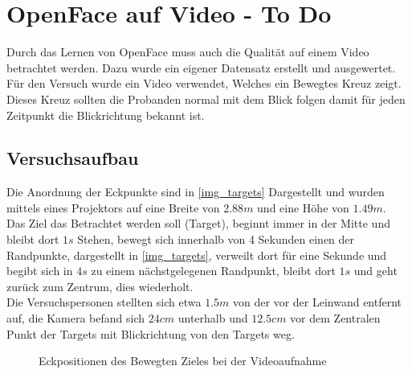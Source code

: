 \section{OpenFace auf Video - To Do}
Durch das Lernen von OpenFace muss auch die Qualität auf einem Video betrachtet werden. Dazu wurde ein eigener Datensatz erstellt und ausgewertet.\\
Für den Versuch wurde ein Video verwendet, Welches ein Bewegtes Kreuz zeigt. Dieses Kreuz sollten die Probanden normal mit dem Blick folgen damit für jeden Zeitpunkt die Blickrichtung bekannt ist.
\subsection{Versuchsaufbau}
Die Anordnung der Eckpunkte sind in \autoref{img_targets} Dargestellt und wurden mittels eines Projektors auf eine Breite von $2.88m$ und eine Höhe von $1.49m$.\\
Das Ziel das Betrachtet werden soll (Target), beginnt immer in der Mitte und bleibt dort $1s$ Stehen, bewegt sich innerhalb von 4 Sekunden einen der Randpunkte, dargestellt in \autoref{img_targets}, verweilt dort für eine Sekunde und begibt sich in $4s$ zu einem nächstgelegenen Randpunkt, bleibt dort $1s$ und geht zurück zum Zentrum, dies wiederholt.\\
Die Versuchspersonen stellten sich etwa $1.5m$ von der vor der Leinwand entfernt auf, die Kamera befand sich $24cm$ unterhalb und $12.5cm$ vor dem Zentralen Punkt der Targets mit Blickrichtung von den Targets weg.
\begin{figure}
	\centering
	\caption{Eckpositionen des Bewegten Zieles bei der Videoaufnahme}
	\label{img_targets}
\end{figure}
